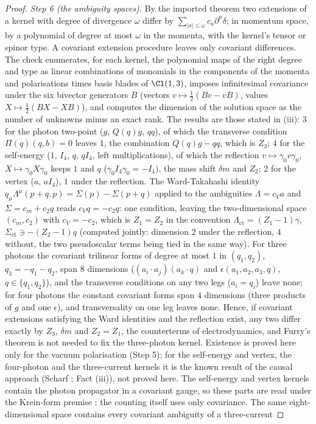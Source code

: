 \begin{proof}
\emph{Step 6 (the ambiguity spaces).} By the imported theorem two extensions of a kernel with degree of divergence $\omega$ differ by $\sum_{|a| \le \omega}c_{a}\partial^{a}\delta$; in momentum space, by a polynomial of degree at most $\omega$ in the momenta, with the kernel's tensor or spinor type. A covariant extension procedure leaves only covariant differences. The check enumerates, for each kernel, the polynomial maps of the right degree and type as linear combinations of monomials in the components of the momenta and polarisations times basis blades of $\Cl(1,3)$, imposes infinitesimal covariance under the six bivector generators $B$ (vectors $v \mapsto \frac12(Bv - vB)$, values $X \mapsto \frac12(BX - XB)$), and computes the dimension of the solution space as the number of unknowns minus an exact rank. The results are those stated in (iii): $3$ for the photon two-point ($g$, $Q(q)g$, $qq$), of which the transverse condition $\Pi(q)(q, b) = 0$ leaves $1$, the combination $Q(q)g - qq$, which is $Z_{3}$; $4$ for the self-energy ($1$, $I_{4}$, $q$, $qI_{4}$, left multiplications), of which the reflection $v \mapsto \gamma_{0}v\gamma_{0}$, $X \mapsto \gamma_{0}X\gamma_{0}$ keeps $1$ and $q$ ($\gamma_{0}I_{4}\gamma_{0} = -I_{4}$), the mass shift $\delta m$ and $Z_{2}$; $2$ for the vertex ($a$, $aI_{4}$), $1$ under the reflection. The Ward-Takahashi identity $q_{\mu}\Lambda^{\mu}(p + q, p) = \Sigma(p) - \Sigma(p + q)$ applied to the ambiguities $\Lambda = c_{V}a$ and $\Sigma = c_{m} + c_{2}q$ reads $c_{V}q = -c_{2}q$: one condition, leaving the two-dimensional space $(c_{m}, c_{2})$ with $c_{V} = -c_{2}$, which is $Z_{1} = Z_{2}$ in the convention $\Lambda_{\mathrm{ct}} = (Z_{1} - 1)\gamma$, $\Sigma_{\mathrm{ct}} \ni -(Z_{2} - 1)q$ (computed jointly: dimension $2$ under the reflection, $4$ without, the two pseudoscalar terms being tied in the same way). For three photons the covariant trilinear forms of degree at most $1$ in $(q_{1}, q_{2})$, $q_{3} = -q_{1} - q_{2}$, span $8$ dimensions ($(a_{i}\cdot a_{j})(a_{k}\cdot q)$ and $\epsilon(a_{1}, a_{2}, a_{3}, q)$, $q \in \{q_{1}, q_{2}\}$), and the transverse conditions on any two legs ($a_{i} = q_{i}$) leave none; for four photons the constant covariant forms span $4$ dimensions (three products of $g$ and one $\epsilon$), and transversality on one leg leaves none. Hence, if covariant extensions satisfying the Ward identities and the reflection exist, any two differ exactly by $Z_{3}$, $\delta m$ and $Z_{2} = Z_{1}$, the counterterms of electrodynamics, and Furry's theorem is not needed to fix the three-photon kernel. Existence is proved here only for the vacuum polarisation (Step 5); for the self-energy and vertex, the four-photon and the three-current kernels it is the known result of the causal approach (Scharf \cite{Scharf1995}; Fact (iii)), not proved here. The self-energy and vertex kernels contain the photon propagator in a covariant gauge, so these parts are read under the Krein-form premise ; the counting itself uses only covariance. The same eight-dimensional space contains every covariant ambiguity of a three-current 
\end{proof}
